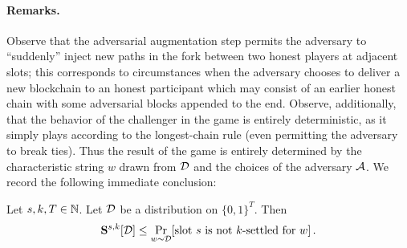 \paragraph{Remarks.}
Observe that the adversarial augmentation step permits the adversary to
``suddenly'' inject new paths in the fork between two honest
players at adjacent slots; this corresponds to circumstances
when the adversary chooses to deliver a new blockchain to an honest
participant which may consist of an earlier honest chain with some
adversarial blocks appended to the end. Observe, additionally, that
the behavior of the challenger in the game is entirely deterministic,
as it simply plays according to the longest-chain rule (even
permitting the adversary to break ties). Thus the result of the game
is entirely determined by the characteristic string $w$ drawn from
$\mathcal{D}$ and the choices of the adversary $\mathcal{A}$. 
We record the
following immediate conclusion:
\begin{lemma}\label{lem:main-forks}
  Let 
  $s, k, T \in \mathbb{N}$. 
  Let $\mathcal{D}$ be a distribution on $\{0,1\}^T$. Then
  \[
    \mathbf{S}^{s,k}[\mathcal{D}] \leq 
      \Pr_{w \sim \mathcal{D}}[\text{slot $s$ is not $k$-settled for $w$}]
    \,.
  \]
\end{lemma}

